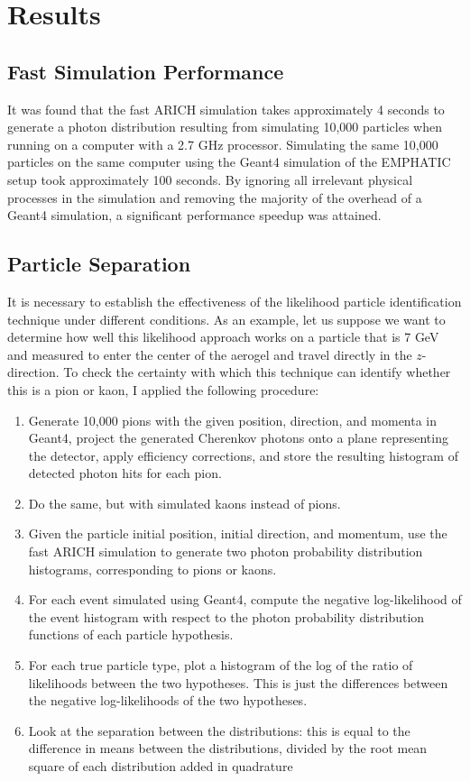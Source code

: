 
\chapter{Results}
\label{ch:Results}

\section{Fast Simulation Performance}
It was found that the fast ARICH simulation takes approximately 4 seconds to generate a photon distribution resulting from simulating 10,000 particles when running on a computer with a 2.7 GHz processor. 
Simulating the same 10,000 particles on the same computer using the Geant4 simulation of the EMPHATIC setup took approximately 100 seconds.
By ignoring all irrelevant physical processes in the simulation and removing the majority of the overhead of a Geant4 simulation, a significant performance speedup was attained.

\section{Particle Separation}
It is necessary to establish the effectiveness of the likelihood particle identification technique under different conditions.
As an example, let us suppose we want to determine how well this likelihood approach works on a particle that is 7 GeV and measured to enter the center of the aerogel and travel directly in the $z$-direction.
To check the certainty with which this technique can identify whether this is a pion or kaon, I applied the following procedure:

\begin{enumerate}
\item Generate 10,000 pions with the given position, direction, and momenta in Geant4, project the generated Cherenkov photons onto a plane representing the detector, apply efficiency corrections, and store the resulting histogram of detected photon hits for each pion. 
\item Do the same, but with simulated kaons instead of pions.
\item Given the particle initial position, initial direction, and momentum, use the fast ARICH simulation to generate two photon probability distribution histograms, corresponding to pions or kaons.
\item For each event simulated using Geant4, compute the negative log-likelihood of the event histogram with respect to the photon probability distribution functions of each particle hypothesis.
\item For each true particle type, plot a histogram of the log of the ratio of likelihoods between the two hypotheses.
This is just the differences between the negative log-likelihoods of the two hypotheses.
\item Look at the separation between the distributions: this is equal to the difference in means between the distributions, divided by the root mean square of each distribution added in quadrature
\end{enumerate}

